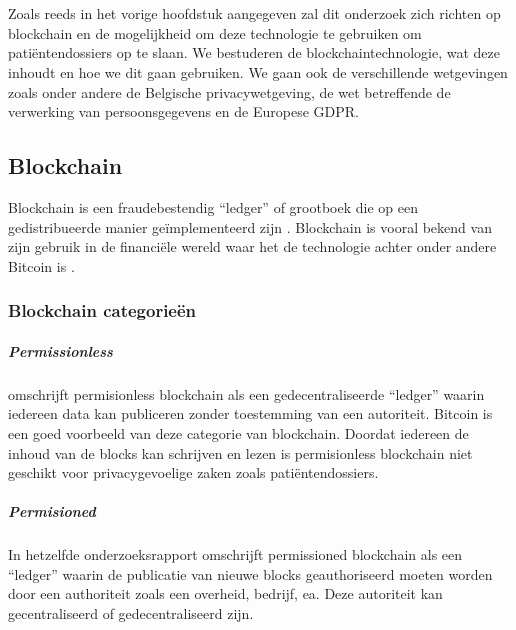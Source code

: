 \chapter{}
\label{ch:stand-van-zaken}

Zoals reeds in het vorige hoofdstuk aangegeven zal dit onderzoek zich richten op blockchain en de mogelijkheid om deze technologie te gebruiken om patiëntendossiers op te slaan. We bestuderen de blockchaintechnologie, wat deze inhoudt en hoe we dit gaan gebruiken. We gaan ook de verschillende wetgevingen zoals onder andere de Belgische privacywetgeving, de wet betreffende de verwerking van persoonsgegevens en de Europese GDPR.
\section{Blockchain}
\label{ch:blockchain}

Blockchain is een fraudebestendig ``ledger'' of grootboek die op een gedistribueerde manier geïmplementeerd zijn \autocite{Yaga2018}. Blockchain is vooral bekend van zijn gebruik in de financiële wereld waar het de technologie achter onder andere Bitcoin is \autocite{Nofer2017}. 

\subsection{Blockchain categorieën}

\paragraph{Permissionless}

\textcite{Yaga2018} omschrijft permisionless blockchain als een gedecentraliseerde ``ledger'' waarin iedereen data kan publiceren zonder toestemming van een autoriteit. Bitcoin is een goed voorbeeld van deze categorie van blockchain. Doordat iedereen de inhoud van de blocks kan schrijven en lezen is permisionless blockchain niet geschikt voor privacygevoelige zaken zoals patiëntendossiers.


\paragraph{Permisioned}

In hetzelfde onderzoeksrapport omschrijft \textcite{Yaga2018} permissioned blockchain als een ``ledger'' waarin de publicatie van nieuwe blocks geauthoriseerd moeten worden door een authoriteit zoals een overheid, bedrijf, ea. Deze autoriteit kan gecentraliseerd of gedecentraliseerd zijn.